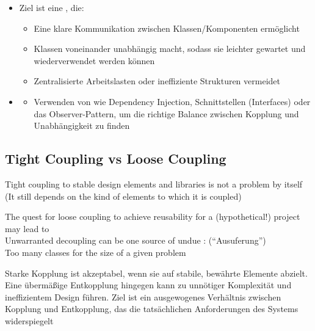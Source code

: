 \begin{infoBox}[title=Der optimale Ansatz]
    \begin{itemize}
        \item Ziel ist eine , die:
        \begin{itemize}
            \item Eine klare Kommunikation zwischen Klassen/Komponenten ermöglicht
            \item Klassen voneinander unabhängig macht, sodass sie leichter gewartet und wiederverwendet werden können
            \item Zentralisierte Arbeitslasten oder ineffiziente Strukturen vermeidet
        \end{itemize}
        \item {}
        \begin{itemize}
            \item Verwenden von  wie Dependency Injection, Schnittstellen (Interfaces) oder das Observer-Pattern, um die richtige Balance zwischen Kopplung und Unabhängigkeit zu finden
        \end{itemize}
    \end{itemize}
\end{infoBox}
\subsection{Tight Coupling vs Loose Coupling}
\begin{defBox}
    Tight coupling to stable design elements and libraries is not a problem by itself (It still depends on the kind of elements to which it is coupled)
\end{defBox}
\begin{defBox}[title=Warning:]
    The quest for loose coupling to achieve reusability for a (hypothetical!) project may lead to \\
    Unwarranted decoupling can be one source of undue : (\enquote{Ausuferung})\\
    Too many classes for the size of a given problem
\end{defBox}
\begin{infoBox}
    Starke Kopplung ist akzeptabel, wenn sie auf stabile, bewährte Elemente abzielt. Eine übermäßige Entkopplung hingegen kann zu unnötiger Komplexität und ineffizientem Design führen. Ziel ist ein ausgewogenes Verhältnis zwischen Kopplung und Entkopplung, das die tatsächlichen Anforderungen des Systems widerspiegelt
\end{infoBox}
